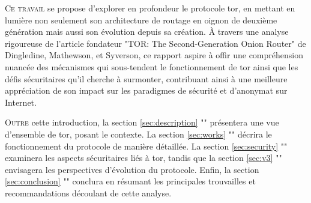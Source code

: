 \lettrine{C}{e travail} se propose d'explorer en profondeur le protocole \acrshort{tor}, en mettant en lumière non seulement son architecture de routage en oignon de deuxième génération mais aussi son évolution depuis sa création. 
À travers une analyse rigoureuse de l'article fondateur "TOR: The Second-Generation Onion Router" \cite[Tor]{dingledine_tor_2004} de Dingledine, Mathewson, et Syverson, ce rapport aspire à offir une compréhension nuancée des mécanismes qui sous-tendent le fonctionnement de \acrshort{tor} ainsi que les défis sécuritaires qu'il cherche à surmonter, contribuant ainsi à une meilleure appréciation de son impact sur les paradigmes de sécurité et d'anonymat sur Internet.

\lettrine{O}{utre} cette introduction, la section \ref{sec:description} "" présentera une vue d'ensemble de \acrshort{tor}, posant le contexte.
La section \ref{sec:works} "" décrira le fonctionnement du protocole de manière détaillée.
La section \ref{sec:security} "" examinera les aspects sécuritaires liés à \acrshort{tor}, tandis que la section \ref{sec:v3} "" envisagera les perspectives d'évolution du protocole. 
Enfin, la section \ref{sec:conclusion} "" conclura en résumant les principales trouvailles et recommandations découlant de cette analyse.

